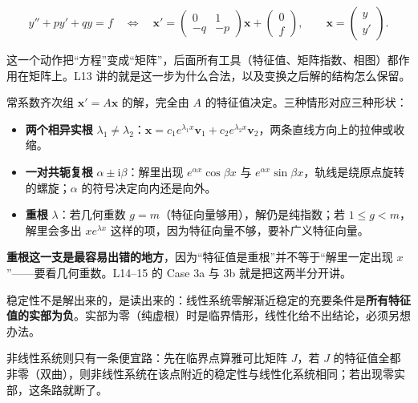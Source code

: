 \documentclass[11pt]{ctexart}
\begin{document}
\[
y''+py'+qy=f \quad\Longleftrightarrow\quad
\mathbf{x}'=\begin{pmatrix}0&1\\-q&-p\end{pmatrix}\mathbf{x}+\begin{pmatrix}0\\f\end{pmatrix},
\qquad \mathbf{x}=\begin{pmatrix}y\\y'\end{pmatrix}.
\]

这一个动作把“方程”变成“矩阵”，后面所有工具（特征值、矩阵指数、相图）都作用在矩阵上。L13 讲的就是这一步为什么合法，以及变换之后解的结构怎么保留。


常系数齐次组 $\mathbf{x}'=A\mathbf{x}$ 的解，完全由 $A$ 的特征值决定。三种情形对应三种形状：

\begin{itemize}
  \item \textbf{两个相异实根} $\lambda_1\neq\lambda_2$：$\mathbf{x}=c_1e^{\lambda_1x}\mathbf{v}_1+c_2e^{\lambda_2x}\mathbf{v}_2$，两条直线方向上的拉伸或收缩。
  \item \textbf{一对共轭复根} $\alpha\pm\mathrm{i}\beta$：解里出现 $e^{\alpha x}\cos\beta x$ 与 $e^{\alpha x}\sin\beta x$，轨线是绕原点旋转的螺旋；$\alpha$ 的符号决定向内还是向外。
  \item \textbf{重根} $\lambda$：若几何重数 $g=m$（特征向量够用），解仍是纯指数；若 $1\le g<m$，解里会多出 $xe^{\lambda x}$ 这样的项，因为特征向量不够，要补广义特征向量。
\end{itemize}

\textbf{重根这一支是最容易出错的地方}，因为“特征值是重根”并不等于“解里一定出现 $x$”——要看几何重数。L14--15 的 Case 3a 与 3b 就是把这两半分开讲。


稳定性不是解出来的，是读出来的：线性系统零解渐近稳定的充要条件是\textbf{所有特征值的实部为负}。实部为零（纯虚根）时是临界情形，线性化给不出结论，必须另想办法。

非线性系统则只有一条便宜路：先在临界点算雅可比矩阵 $J$，若 $J$ 的特征值全都非零（双曲），则非线性系统在该点附近的稳定性与线性化系统相同；若出现零实部，这条路就断了。

\end{document}
